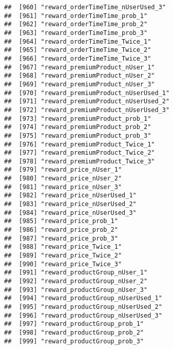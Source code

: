 \documentclass[10pt]{report}
\begin{document}
\begin{verbatim}
##  [960] "reward_orderTimeTime_nUserUsed_3"                     
##  [961] "reward_orderTimeTime_prob_1"                          
##  [962] "reward_orderTimeTime_prob_2"                          
##  [963] "reward_orderTimeTime_prob_3"                          
##  [964] "reward_orderTimeTime_Twice_1"                         
##  [965] "reward_orderTimeTime_Twice_2"                         
##  [966] "reward_orderTimeTime_Twice_3"                         
##  [967] "reward_premiumProduct_nUser_1"                        
##  [968] "reward_premiumProduct_nUser_2"                        
##  [969] "reward_premiumProduct_nUser_3"                        
##  [970] "reward_premiumProduct_nUserUsed_1"                    
##  [971] "reward_premiumProduct_nUserUsed_2"                    
##  [972] "reward_premiumProduct_nUserUsed_3"                    
##  [973] "reward_premiumProduct_prob_1"                         
##  [974] "reward_premiumProduct_prob_2"                         
##  [975] "reward_premiumProduct_prob_3"                         
##  [976] "reward_premiumProduct_Twice_1"                        
##  [977] "reward_premiumProduct_Twice_2"                        
##  [978] "reward_premiumProduct_Twice_3"                        
##  [979] "reward_price_nUser_1"                                 
##  [980] "reward_price_nUser_2"                                 
##  [981] "reward_price_nUser_3"                                 
##  [982] "reward_price_nUserUsed_1"                             
##  [983] "reward_price_nUserUsed_2"                             
##  [984] "reward_price_nUserUsed_3"                             
##  [985] "reward_price_prob_1"                                  
##  [986] "reward_price_prob_2"                                  
##  [987] "reward_price_prob_3"                                  
##  [988] "reward_price_Twice_1"                                 
##  [989] "reward_price_Twice_2"                                 
##  [990] "reward_price_Twice_3"                                 
##  [991] "reward_productGroup_nUser_1"                          
##  [992] "reward_productGroup_nUser_2"                          
##  [993] "reward_productGroup_nUser_3"                          
##  [994] "reward_productGroup_nUserUsed_1"                      
##  [995] "reward_productGroup_nUserUsed_2"                      
##  [996] "reward_productGroup_nUserUsed_3"                      
##  [997] "reward_productGroup_prob_1"                           
##  [998] "reward_productGroup_prob_2"                           
##  [999] "reward_productGroup_prob_3"                           

\end{verbatim}
\end{document}
